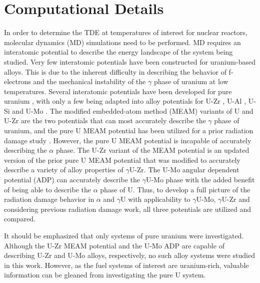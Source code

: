 \documentclass[review]{elsarticle}
\begin{document}
\section{Computational Details}
In order to determine the TDE at temperatures of interest for nuclear reactors, molecular dynamics (MD) \cite{abraham1986, allen1987} simulations need to be performed. MD requires an interatomic potential to describe the energy landscape of the system being studied. Very few interatomic potentials have been constructed for uranium-based alloys. This is due to the inherent difficulty in describing the behavior of f-electrons and the mechanical instability of the $\gamma$ phase of uranium at low temperatures. Several interatomic potentials have been developed for pure uranium \cite{beeler_meam, beelerASTM, fernandez2014, li2011, smirnova2012, li2012}, with only a few being adapted into alloy potentials for U-Zr \cite{moore2015}, U-Al \cite{pascuet2012}, U-Si \cite{beelerUSi} and U-Mo \cite{smirnovaUMo}. The modified embedded-atom method (MEAM) variants of U and U-Zr \cite{beeler_meam, moore2015} are the two potentials that can most accurately describe the $\gamma$ phase of uranium, and the pure U MEAM potential \cite{beeler_meam} has been utilized for a prior radiation damage study \cite{miao2015}. However, the pure U MEAM potential is incapable of accurately describing the $\alpha$ phase. The U-Zr variant of the MEAM potential is an updated version of the prior pure U MEAM potential that was modified to accurately describe a variety of alloy properties of $\gamma$U-Zr. The U-Mo angular dependent potential (ADP) \cite{smirnovaADP} can accurately describe the $\gamma$U-Mo phase with the added benefit of being able to describe the $\alpha$ phase of U. Thus, to develop a full picture of the radiation damage behavior in $\alpha$ and $\gamma$U with applicability to $\gamma$U-Mo, $\gamma$U-Zr and considering previous radiation damage work, all three potentials are utilized and compared. 

It should be emphasized that only systems of pure uranium were investigated. Although the U-Zr MEAM potential and the U-Mo ADP are capable of describing U-Zr and U-Mo alloys, respectively, no such alloy systems were studied in this work. However, as the fuel systems of interest are uranium-rich, valuable information can be gleaned from investigating the pure U system.
\end{document}
